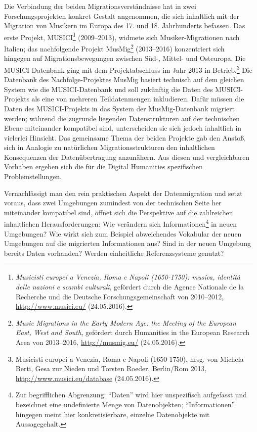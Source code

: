 \documentclass[a4paper,
fontsize=11pt,
oneside,
numbers=noperiodatend,
parskip=half-,
bibliography=totoc,
final
]{scrartcl}
\begin{document}
Die Verbindung der beiden Migrationsverständnisse hat in zwei
Forschungsprojekten konkret Gestalt angenommen, die sich inhaltlich mit
der Migration von Musikern im Europa des 17. und 18. Jahrhunderts
befassen. Das erste Projekt, MUSICI\footnote{\emph{Musicisti europei a
  Venezia, Roma e Napoli (1650-1750): musica, identità delle nazioni e
  scambi culturali}, gefördert durch die Agence Nationale de la
  Recherche und die Deutsche Forschungsgemeinschaft von 2010--2012,
  \url{http://www.musici.eu/} (24.05.2016).} (2009--2013), widmete sich
Musiker-Migrationen nach Italien; das nachfolgende Projekt
MusMig\footnote{\emph{Music Migrations in the Early Modern Age: the
  Meeting of the European East, West and South}, gefördert durch
  Humanities in the European Research Area von 2013--2016,
  \url{http://musmig.eu/} (24.05.2016).} (2013--2016) konzentriert sich
hingegen auf Migrationsbewegungen zwischen Süd-, Mittel- und Osteuropa.
Die MUSICI-Daten\-bank ging mit dem Projektabschluss im Jahr 2013 in
Betrieb.\footnote{Musicisti europei a Venezia, Roma e Napoli
  (1650-1750), hrsg. von Michela Berti, Gesa zur Nieden und Torsten
  Roeder, Berlin/Rom 2013, \url{http://www.musici.eu/database}
  (24.05.2016).} Die Datenbank des Nachfolge-Projektes MusMig basiert
technisch auf dem gleichen System wie die MUSICI-Daten\-bank und soll
zukünftig die Daten des MUSICI-Projekts als eine von mehreren
Teildatenmengen inkludieren. Dafür müssen die Daten des MUSICI-Projekts
in das System der MusMig-Datenbank migriert werden; während die zugrunde
liegenden Datenstrukturen auf der technischen Ebene miteinander
kompatibel sind, unterscheiden sie sich jedoch inhaltlich in vielerlei
Hinsicht. Das gemeinsame Thema der beiden Projekte gab den Anstoß, sich
in Analogie zu natürlichen Migrationsstrukturen den inhaltlichen
Konsequenzen der Datenübertragung anzunähern. Aus diesen und
vergleichbaren Vorhaben ergeben sich die für die Digital Humanities
spezifischen Problemstellungen.

Vernachlässigt man den rein praktischen Aspekt der Datenmigration und
setzt voraus, dass zwei Umgebungen zumindest von der technischen Seite
her miteinander kompatibel sind, öffnet sich die Perspektive auf die
zahlreichen inhaltlichen Herausforderungen: Wie verändern sich
Informationen\footnote{Zur begrifflichen Abgrenzung: \enquote{Daten}
  wird hier unspezifisch aufgefasst und bezeichnet eine undefinierte
  Menge von Datenobjekten; \enquote{Informationen} hingegen meint hier
  konkretisierbare, einzelne Datenobjekte mit Aussagegehalt.} in neuen
Umgebungen? Wie wirkt sich zum Beispiel abweichendes Vokabular der neuen
Umgebungen auf die migrierten Informationen aus? Sind in der neuen
Umgebung bereits Daten vorhanden? Werden einheitliche Referenzsysteme
genutzt?
\end{document}
